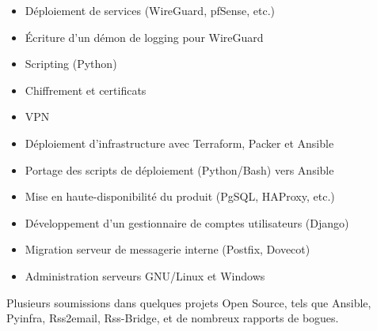\documentclass[10pt,a4paper,ragged2e,withhyper]{altacv}
\begin{document}
\begin{paracol}{2}

\begin{itemize}
    \item Déploiement de services (WireGuard, pfSense, etc.)
    \item Écriture d'un démon de logging pour WireGuard
\end{itemize}

\begin{itemize}
    \item Scripting (Python)
    \item Chiffrement et certificats
    \item VPN
\end{itemize}

\begin{itemize}
    \item Déploiement d'infrastructure avec Terraform, Packer et Ansible
    \item Portage des scripts de déploiement (Python/Bash) vers Ansible
    \item Mise en haute-disponibilité du produit (PgSQL, HAProxy, etc.)
\end{itemize}

\begin{itemize}
        \item Développement d'un gestionnaire de comptes utilisateurs (Django)
        \item Migration serveur de messagerie interne (Postfix, Dovecot)
        \item Administration serveurs GNU/Linux et Windows
\end{itemize}


Plusieurs soumissions dans quelques projets Open Source, tels que Ansible, Pyinfra, Rss2email, Rss-Bridge, et de nombreux rapports de bogues.


\end{paracol}
\end{document}
